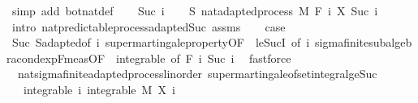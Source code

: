 \begin{isabellebody}
\ {\isacharparenleft}{\kern0pt}simp\ add{\isacharcolon}{\kern0pt}\ bot{\isacharunderscore}{\kern0pt}nat{\isacharunderscore}{\kern0pt}def{\isacharparenright}{\kern0pt}\isanewline
{}\isamarkupfalse%
\isanewline
\ \ \isamarkupfalse%
\ {\isacharparenleft}{\kern0pt}Suc\ i{\isacharparenright}{\kern0pt}\isanewline
\ \ \isamarkupfalse%
\ S{\isacharcolon}{\kern0pt}\ nat{\isacharunderscore}{\kern0pt}adapted{\isacharunderscore}{\kern0pt}process\ M\ F\ {\isachardoublequoteopen}{\isasymlambda}i{\isachardot}{\kern0pt}\ X\ {\isacharparenleft}{\kern0pt}Suc\ i{\isacharparenright}{\kern0pt}{\isachardoublequoteclose}\ \isamarkupfalse%
\ {\isacharparenleft}{\kern0pt}intro\ nat{\isacharunderscore}{\kern0pt}predictable{\isacharunderscore}{\kern0pt}process{\isachardot}{\kern0pt}adapted{\isacharunderscore}{\kern0pt}Suc\ assms{\isacharparenright}{\kern0pt}\isanewline
\ \ \isamarkupfalse%
\ {\isacharquery}{\kern0pt}case\ \isamarkupfalse%
\ Suc\ S{\isachardot}{\kern0pt}adapted{\isacharbrackleft}{\kern0pt}of\ i{\isacharbrackright}{\kern0pt}\ supermartingale{\isacharunderscore}{\kern0pt}property{\isacharbrackleft}{\kern0pt}OF\ {\isacharunderscore}{\kern0pt}\ le{\isacharunderscore}{\kern0pt}SucI{\isacharcomma}{\kern0pt}\ of\ i{\isacharbrackright}{\kern0pt}\ sigma{\isacharunderscore}{\kern0pt}finite{\isacharunderscore}{\kern0pt}subalgebra{\isachardot}{\kern0pt}cond{\isacharunderscore}{\kern0pt}exp{\isacharunderscore}{\kern0pt}F{\isacharunderscore}{\kern0pt}meas{\isacharbrackleft}{\kern0pt}OF\ {\isacharunderscore}{\kern0pt}\ integrable{\isacharcomma}{\kern0pt}\ of\ {\isachardoublequoteopen}F\ i{\isachardoublequoteclose}\ {\isachardoublequoteopen}Suc\ i{\isachardoublequoteclose}{\isacharbrackright}{\kern0pt}\ \isamarkupfalse%
\ fastforce\isanewline
{}\isamarkupfalse%
%
\endisatagproof
{\isafoldproof}%
%
\isadelimproof
\isanewline
%
\endisadelimproof
\isanewline
{}\isamarkupfalse%
\ {\isacharparenleft}{\kern0pt}\ nat{\isacharunderscore}{\kern0pt}sigma{\isacharunderscore}{\kern0pt}finite{\isacharunderscore}{\kern0pt}adapted{\isacharunderscore}{\kern0pt}process{\isacharunderscore}{\kern0pt}linorder{\isacharparenright}{\kern0pt}\ supermartingale{\isacharunderscore}{\kern0pt}of{\isacharunderscore}{\kern0pt}set{\isacharunderscore}{\kern0pt}integral{\isacharunderscore}{\kern0pt}ge{\isacharunderscore}{\kern0pt}Suc{\isacharcolon}{\kern0pt}\isanewline
\ \ \ integrable{\isacharcolon}{\kern0pt}\ {\isachardoublequoteopen}{\isasymAnd}i{\isachardot}{\kern0pt}\ integrable\ M\ {\isacharparenleft}{\kern0pt}X\ i{\isacharparenright}{\kern0pt}{\isachardoublequoteclose}\ \isanewline

\end{isabellebody}
